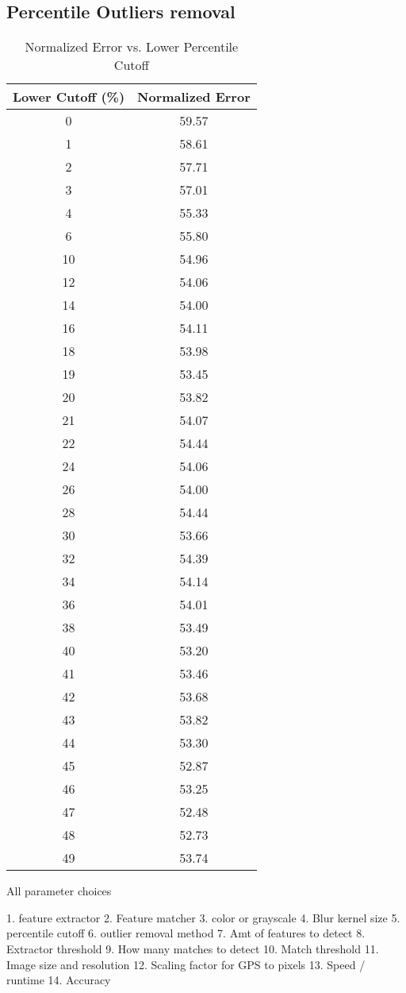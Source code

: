 \subsection*{Percentile Outliers removal}


\begin{table}[H]
\centering
\begin{tabular}{|c|c|}
\hline
\textbf{Lower Cutoff (\%)} & \textbf{Normalized Error} \\ \hline
0  & 59.57 \\ \hline
1  & 58.61 \\ \hline
2  & 57.71 \\ \hline
3  & 57.01 \\ \hline
4  & 55.33 \\ \hline
6  & 55.80 \\ \hline
10 & 54.96 \\ \hline
12 & 54.06 \\ \hline
14 & 54.00 \\ \hline
16 & 54.11 \\ \hline
18 & 53.98 \\ \hline
19 & 53.45 \\ \hline
20 & 53.82 \\ \hline
21 & 54.07 \\ \hline
22 & 54.44 \\ \hline
24 & 54.06 \\ \hline
26 & 54.00 \\ \hline
28 & 54.44 \\ \hline
30 & 53.66 \\ \hline
32 & 54.39 \\ \hline
34 & 54.14 \\ \hline
36 & 54.01 \\ \hline
38 & 53.49 \\ \hline
40 & 53.20 \\ \hline
41 & 53.46 \\ \hline
42 & 53.68 \\ \hline
43 & 53.82 \\ \hline
44 & 53.30 \\ \hline
45 & 52.87 \\ \hline
46 & 53.25 \\ \hline
47 & 52.48 \\ \hline
48 & 52.73 \\ \hline
49 & 53.74 \\ \hline
\end{tabular}
\caption{Normalized Error vs. Lower Percentile Cutoff}
\label{tab:normalized_error}
\end{table}


All parameter choices

1. feature extractor
2. Feature matcher
3. color or grayscale
4. Blur kernel size
5. percentile cutoff
6. outlier removal method
7. Amt of features to detect
8. Extractor threshold
9. How many matches to detect
10. Match threshold
11. Image size and resolution
12. Scaling factor for GPS to pixels
13. Speed / runtime
14. Accuracy   